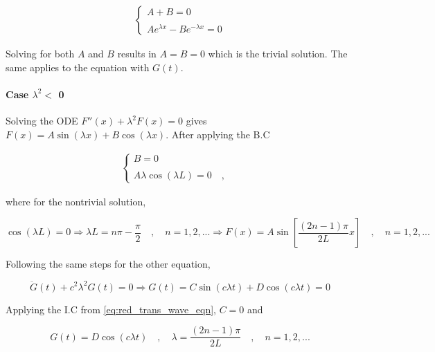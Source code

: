 \documentclass{article}
\begin{document}
\begin{equation*}
\begin{matrix}
    \begin{cases}
        A + B = 0 \\
        \\
        A e^{\lambda x} - B e^{-\lambda x} = 0
    \end{cases}
\end{matrix}
\end{equation*}

Solving for both $A$ and $B$ results in $A = B = 0$ which is the trivial solution. The same applies to the equation with $G(t)$.

\paragraph{Case $\lambda^2 <$ 0}
Solving the ODE $F''(x) + \lambda^2 F(x) = 0$ gives $F(x) = A \sin(\lambda x) + B \cos(\lambda x)$. After applying the B.C

\begin{equation*}
\begin{matrix}
    \begin{cases}
        B = 0 \\
        \\
        A \lambda \cos(\lambda L) = 0 \quad , \quad
    \end{cases}
\end{matrix}
\end{equation*}

where for the nontrivial solution, 

\begin{equation*}
    \cos(\lambda L) = 0 \Rightarrow \lambda L = n \pi - \frac{\pi}{2} \quad , \quad n = 1, 2, ... \Rightarrow F(x) = A \sin \left[ \dfrac{(2n - 1)\pi}{2L} x \right] \quad , \quad n = 1, 2, ...
\end{equation*}

Following the same steps for the other equation,

\begin{equation*}
    \ddot{G}(t) + c^2 \lambda^2 G(t) = 0 \Rightarrow G(t) = C \sin(c \lambda t) + D \cos(c \lambda t) = 0
\end{equation*}

Applying the I.C from \cref{eq:red_trans_wave_eqn}, $C = 0$ and 

\begin{equation*}
    G(t) = D \cos(c \lambda t) \quad , \quad \lambda = \dfrac{(2n-1)\pi}{2L} \quad , \quad n = 1, 2, ...
\end{equation*}
\end{document}
